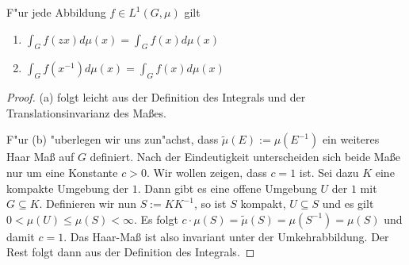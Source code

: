 	
	\begin{lemma}F"ur jede Abbildung $f\in L^{1}(G,\mu)$ gilt
		\begin{enumerate}[label=\emph{(\alph*)}]
			\item $\int_{G} f(zx)d\mu(x) = \int_{G} f(x)d\mu(x)$
			\item $\int_{G} f(x^{-1})d\mu(x) = \int_{G} f(x)d\mu(x)$
		\end{enumerate}
	\end{lemma}
	\begin{proof}
		(a) folgt leicht aus der Definition des Integrals und der Translationsinvarianz des Maßes.
		
		F"ur (b) "uberlegen wir uns zun"achst, dass $\tilde{\mu}(E):= \mu(E^{-1})$ ein weiteres Haar Maß auf $G$ definiert. Nach der Eindeutigkeit unterscheiden sich beide Maße nur um eine Konstante $c > 0$. Wir wollen zeigen, dass $c=1$ ist.
		Sei dazu $K$ eine kompakte Umgebung der $1$. Dann gibt es eine offene Umgebung $U$ der $1$ mit $G \subseteq K$. Definieren wir nun $S := KK^{-1}$, so ist $S$ kompakt, $U \subseteq S$ und es gilt $0 < \mu(U) \leq \mu(S)<\infty$. 
		Es folgt $ c\cdot \mu(S) = \tilde{\mu}(S) = \mu(S^{-1}) =\mu(S)$ und damit $c=1$. Das Haar-Maß ist also invariant unter der Umkehrabbildung. Der Rest folgt dann aus der Definition des Integrals.
	\end{proof}
	
	
